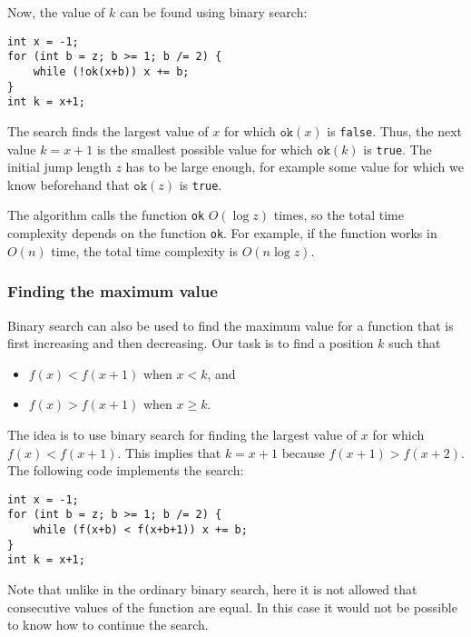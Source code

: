 \noindent
Now, the value of $k$ can be found using binary search:

\begin{lstlisting}
int x = -1;
for (int b = z; b >= 1; b /= 2) {
    while (!ok(x+b)) x += b;
}
int k = x+1;
\end{lstlisting}

The search finds the largest value of $x$ for which
$\texttt{ok}(x)$ is \texttt{false}.
Thus, the next value $k=x+1$
is the smallest possible value for which
$\texttt{ok}(k)$ is \texttt{true}.
The initial jump length $z$ has to be
large enough, for example some value
for which we know beforehand that $\texttt{ok}(z)$ is \texttt{true}.

The algorithm calls the function \texttt{ok}
$O(\log z)$ times, so the total time complexity
depends on the function \texttt{ok}.
For example, if the function works in $O(n)$ time,
the total time complexity is $O(n \log z)$.

\subsubsection{Finding the maximum value}

Binary search can also be used to find
the maximum value for a function that is
first increasing and then decreasing.
Our task is to find a position $k$ such that

\begin{itemize}
\item
$f(x)<f(x+1)$ when $x<k$, and
\item
$f(x)>f(x+1)$ when $x \ge k$.
\end{itemize}

The idea is to use binary search
for finding the largest value of $x$
for which $f(x)<f(x+1)$.
This implies that $k=x+1$
because $f(x+1)>f(x+2)$.
The following code implements the search:

\begin{lstlisting}
int x = -1;
for (int b = z; b >= 1; b /= 2) {
    while (f(x+b) < f(x+b+1)) x += b;
}
int k = x+1;
\end{lstlisting}

Note that unlike in the ordinary binary search,
here it is not allowed that consecutive values
of the function are equal.
In this case it would not be possible to know
how to continue the search.
